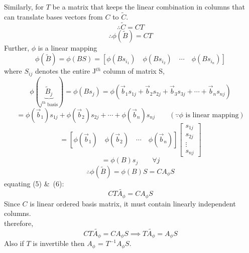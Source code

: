 \documentclass[12pt]{article}
\begin{document}
Similarly, for $T$ be a matrix that keeps the linear combination in columns that can translate bases vectors from $C$ to $\tilde{C}$.
\newpage
\begin{equation}
    \therefore \tilde{C}=CT
\end{equation}
\begin{equation}
    \therefore \phi({\tilde{B}})=CT
\end{equation}
Further, $\phi$ is a linear mapping 
\begin{equation*}
\phi(\tilde{B})=\phi(BS)=
\left[
\phi(B s_{i_1}) \quad
\phi(B s_{i_2}) \quad
\cdots \quad
\phi(B s_{i_n})
\right]
\end{equation*}
where $S_{ij}$ denotes the entire J$^{th}$ column of matrix S,
\begin{equation*}
\phi(\underbrace{\tilde{B}_j}_{\text{$j^{\text{th}}$ basis}}) = \phi(B s_j) = \phi\left( \vec{b}_1 s_{1j} + \vec{b}_2 s_{2j} + \vec{b}_3 s_{3j} + \cdots + \vec{b}_n s_{nj} \right)
\end{equation*}
\begin{equation*}
= \phi(\vec{b}_1) s_{1j} + \phi(\vec{b}_2) s_{2j} + \cdots + \phi(\vec{b}_n) s_{nj} \qquad (\because \phi \text{ is linear mapping})
\end{equation*}
\begin{equation*}
= \left[ \phi(\vec{b}_1) \quad \phi(\vec{b}_2) \quad \cdots \quad \phi(\vec{b}_n) \right]
\begin{bmatrix}
s_{1j} \\
s_{2j} \\
\vdots \\
s_{nj}
\end{bmatrix}
\end{equation*}
\begin{equation*}
= \phi(B) s_j \qquad \forall j
\end{equation*}
\begin{equation}
    \therefore \phi(\tilde{B})= \phi(B)S=CA_{\phi}S 
\end{equation}
equating (5) \&\ (6):
\begin{equation*}
    CT \tilde{A_{\phi}}=CA_{\phi}S
\end{equation*}
Since $C$ is linear ordered basis matrix, it must contain linearly independent columns.
\\therefore,
\begin{equation*}
    CT\tilde{A_{\phi}}=CA_{\phi}S
    \implies T\tilde{A_{\phi}}=A_{\phi}S
\end{equation*}
Also if $T$ is invertible then $A_{\phi}$ = $T^{-1}A_{\phi}S$.\\
\end{document}

